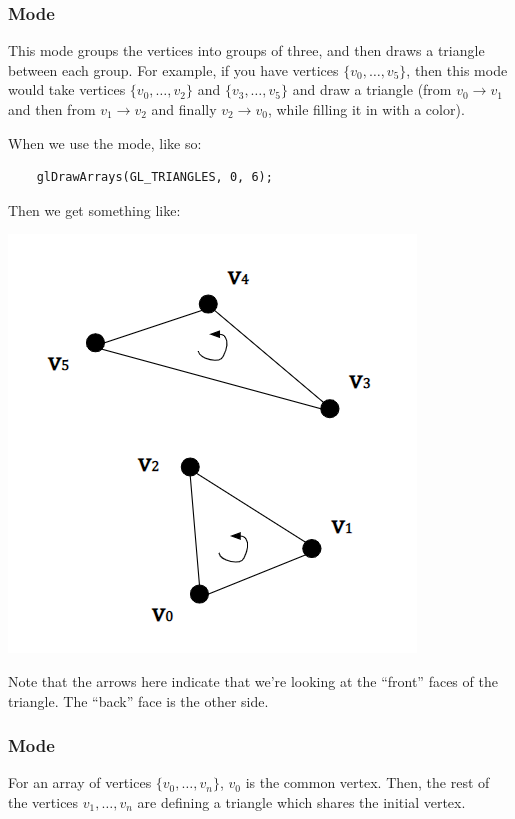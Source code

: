\documentclass[letterpaper]{article}
\begin{document}
\subsubsection{ Mode}
This mode groups the vertices into groups of three, and then draws a triangle between each group. For example, if you have vertices $\{v_0, \dots, v_5\}$, then this mode would take vertices $\{v_0, \dots, v_2\}$ and $\{v_3, \dots, v_5\}$ and draw a triangle (from $v_0 \to v_1$ and then from $v_1 \to v_2$ and finally $v_2 \to v_0$, while filling it in with a color).

\bigskip 

When we use the  mode, like so: 
\begin{verbatim}
    glDrawArrays(GL_TRIANGLES, 0, 6);
\end{verbatim}
Then we get something like: 
\begin{center}
    \includegraphics[scale=0.5]{../assets/triangle1.png}
\end{center}
Note that the arrows here indicate that we're looking at the ``front'' faces of the triangle. The ``back'' face is the other side. 

\subsubsection{ Mode}
For an array of vertices $\{v_0, \dots, v_n\}$, $v_0$ is the common vertex. Then, the rest of the vertices $v_1, \dots, v_n$ are defining a triangle which shares the initial vertex.
\end{document}
